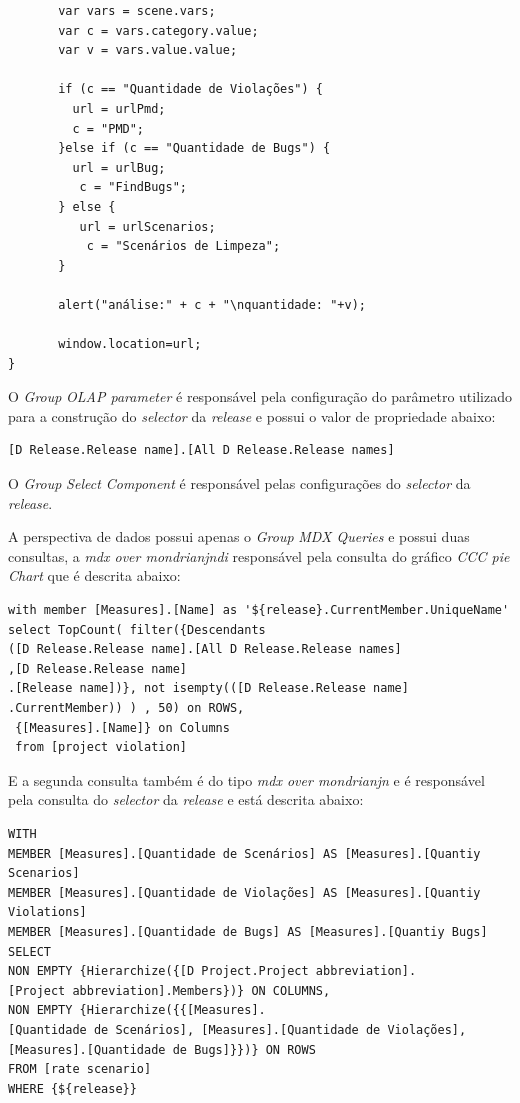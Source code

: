 \begin{apendicesenv}
\begin{verbatim}
       var vars = scene.vars;
       var c = vars.category.value;
       var v = vars.value.value;
       
       if (c == "Quantidade de Violações") {
         url = urlPmd;
         c = "PMD";
       }else if (c == "Quantidade de Bugs") {
         url = urlBug;
          c = "FindBugs";
       } else {
          url = urlScenarios;
           c = "Scenários de Limpeza";
       } 
       
       alert("análise:" + c + "\nquantidade: "+v);
      
       window.location=url;  
} 
\end{verbatim}

O \textit{Group} \textit{OLAP parameter} é responsável pela configuração do parâmetro utilizado para a construção do \textit{selector} da \textit{release} e possui o valor de propriedade abaixo:

\begin{verbatim}
[D Release.Release name].[All D Release.Release names]
\end{verbatim}


O \textit{Group} \textit{Select Component} é responsável pelas configurações do \textit{selector} da \textit{release}.

A perspectiva de dados possui apenas o \textit{Group} \textit{MDX Queries} e possui duas consultas, a \textit{mdx over mondrianjndi} responsável pela consulta do gráfico \textit{CCC pie Chart} que é descrita abaixo:

\begin{verbatim}
with member [Measures].[Name] as '${release}.CurrentMember.UniqueName' 
select TopCount( filter({Descendants
([D Release.Release name].[All D Release.Release names] 
,[D Release.Release name]
.[Release name])}, not isempty(([D Release.Release name]
.CurrentMember)) ) , 50) on ROWS, 
 {[Measures].[Name]} on Columns 
 from [project violation]
\end{verbatim}

E a segunda consulta também é do tipo \textit{mdx over mondrianjn} e é responsável pela consulta do \textit{selector} da \textit{release} e está descrita abaixo:

\begin{verbatim}
WITH 
MEMBER [Measures].[Quantidade de Scenários] AS [Measures].[Quantiy Scenarios]
MEMBER [Measures].[Quantidade de Violações] AS [Measures].[Quantiy Violations]
MEMBER [Measures].[Quantidade de Bugs] AS [Measures].[Quantiy Bugs]
SELECT
NON EMPTY {Hierarchize({[D Project.Project abbreviation].
[Project abbreviation].Members})} ON COLUMNS,
NON EMPTY {Hierarchize({{[Measures].
[Quantidade de Scenários], [Measures].[Quantidade de Violações], 
[Measures].[Quantidade de Bugs]}})} ON ROWS
FROM [rate scenario]
WHERE {${release}}
\end{verbatim}





\end{apendicesenv}

